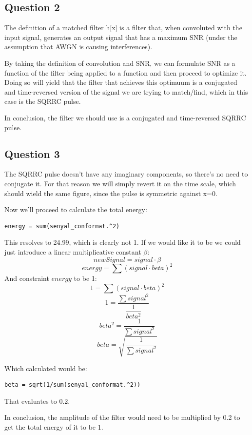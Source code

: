 \documentclass[conference,9pt]{IEEEtran}
\begin{document}
\subsection{Question 2}
The definition of a matched filter h[x] is a filter that, when convoluted with the input signal, generates an output signal that has a maximum SNR (under the assumption that AWGN is causing interferences).

By taking the definition of convolution and SNR, we can formulate SNR as a function of the filter being applied to a function and then proceed to optimize it. Doing so will yield that the filter that achieves this optimuum is a conjugated and time-reversed version\cite{proof} of the signal we are trying to match/find, which in this case is the SQRRC pulse.

In conclusion, the filter we should use is a conjugated and time-reversed SQRRC pulse.

\subsection{Question 3}
The SQRRC pulse doesn't have any imaginary components, so there's no need to conjugate it. For that reason we will simply revert it on the time scale, which should wield the same figure, since the pulse is symmetric against x=0.

Now we'll proceed to calculate the total energy:
\begin{verbatim}
energy = sum(senyal_conformat.^2)
\end{verbatim}
This resolves to 24.99, which is clearly not 1. If we would like it to be we could just introduce a linear multiplicative constant $\beta$:
$$newSignal = signal\cdot \beta$$
$$energy = \sum (signal\cdot beta)^2$$
And constraint $energy$ to be 1:
$$1 = \sum (signal\cdot beta)^2$$
$$1 = \dfrac{\sum signal^2}{\dfrac{1}{beta^2}}$$
$$beta^2 = \dfrac{1}{\sum signal^2}$$
$$beta = \sqrt{\dfrac{1}{\sum signal^2}}$$

Which calculated would be:
\begin{verbatim}
beta = sqrt(1/sum(senyal_conformat.^2))
\end{verbatim}
That evaluates to 0.2.

In conclusion, the amplitude of the filter would need to be multiplied by 0.2 to get the total energy of it to be 1.
\end{document}
